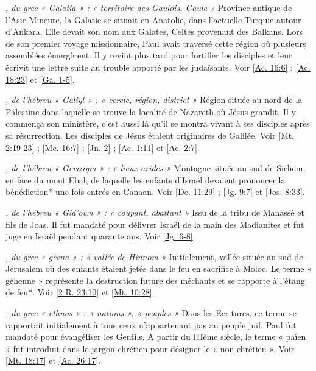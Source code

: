 \begin{multicols}{2}
\textit{, du grec « Galatia » : « territoire des Gaulois, Gaule »}\newline
Province antique de l'Asie Mineure, la Galatie se situait en Anatolie, dans l'actuelle Turquie autour d'Ankara. Elle devait son nom aux Galates, Celtes provenant des Balkans. Lors de son premier voyage missionnaire, Paul avait traversé cette région où plusieurs assemblées émergèrent. Il y revint plus tard pour fortifier les disciples et leur écrivit une lettre suite au trouble apporté par les judaïsants. Voir \vref{Ac. 16:6} ; \vref{Ac. 18:23} et \vref{Ga. 1-5}.

\textit{, de l'hébreu « Galiyl » : « cercle, région, district »}\newline
Région située au nord de la Palestine dans laquelle se trouve la localité de Nazareth où Jésus grandit. Il y commença son ministère, c'est aussi là qu'il se montra vivant à ses disciples après sa résurrection. Les disciples de Jésus étaient originaires de Galilée. Voir \vref{Mt. 2:19-23} ; \vref{Mc. 16:7} ; \vref{Jn. 2} ; \vref{Ac. 1:11} et \vref{Ac. 2:7}.

\textit{, de l'hébreu « Geriziym » : « lieux arides »}\newline
Montagne située au sud de Sichem, en face du mont Ebal, de laquelle les enfants d'Israël devaient prononcer la bénédiction* une fois entrés en Canaan. Voir \vref{De. 11:29} ; \vref{Jg. 9:7} et \vref{Jos. 8:33}.

\textit{, de l'hébreu « Gid'own » : « coupant, abattant »}\newline
Issu de la tribu de Manassé et fils de Joas. Il fut mandaté pour délivrer Israël de la main des Madianites et fut juge en Israël pendant quarante ans. Voir \vref{Jg. 6-8}.

\textit{, du grec « geena » : « vallée de Hinnom »}\newline
Initialement, vallée située au sud de Jérusalem où des enfants étaient jetés dans le feu en sacrifice à Moloc. Le terme « géhenne » représente la destruction future des méchants et se rapporte à l'étang de feu*. Voir \vref{2 R. 23:10} et \vref{Mt. 10:28}.

\textit{, du grec « ethnos » : « nations », « peuples »}\newline
Dans les Ecritures, ce terme se rapportait initialement à tous ceux n'appartenant pas au peuple juif. Paul fut mandaté pour évangéliser les Gentils. A partir du IIIème siècle, le terme « païen » fut introduit dans le jargon chrétien pour désigner le « non-chrétien ». Voir \vref{Mt. 18:17} et \vref{Ac. 26:17}.


\end{multicols}

